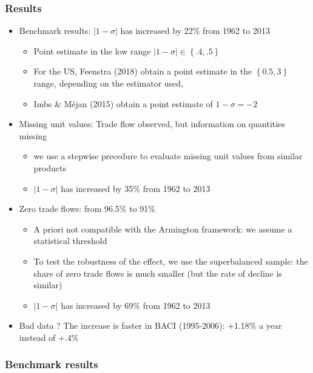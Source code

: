 \documentclass{beamer}
\begin{document}
\begin{frame}[plain]\frametitle{Results}
\begin{itemize}
	\item Benchmark results: $|1-\sigma|$ has increased by 22\% from 1962 to 2013
	\begin{itemize}
		\item Point estimate in the low range $|1-\sigma|\in\left\{.4,.5\right\}$
		\item For the US, Feenstra (2018) obtain a point estimate in the $\left\{0.5,3\right\}$ range, depending on the estimator used,
		\item Imbs \& Méjan (2015) obtain a point estimate of $1-\sigma=-2$
	\end{itemize}
	\item Missing unit values: Trade flow observed, but information on quantities missing
	\begin{itemize}
		\item we use a stepwise precedure to evaluate missing unit values from similar products
		\item $|1-\sigma|$ has increased by 35\% from 1962 to 2013
	\end{itemize}
	\item Zero trade flows: from 96.5\% to 91\%
	\begin{itemize}
		\item A priori not compatible with the Armington framework: we assume a statistical threshold
		\item To test the robustness of the effect, we use the superbalanced sample: the share of zero trade flows is much smaller (but the rate of decline is similar)
		\item $|1-\sigma|$ has increased by 69\% from 1962 to 2013
	\end{itemize}
	\item Bad data ? The increase is faster in BACI (1995-2006): +1.18\% a year instead of +.4\%
\end{itemize}
\end{frame}


\begin{frame}[plain]\frametitle{Benchmark results}
	\begin{figure}[h!]
		\begin{center}
			\setlength{\fboxrule}{1pt} %
			\setlength{\fboxsep}{.1in} %
		\end{center}
	\end{figure}
\end{frame}
\end{document}
